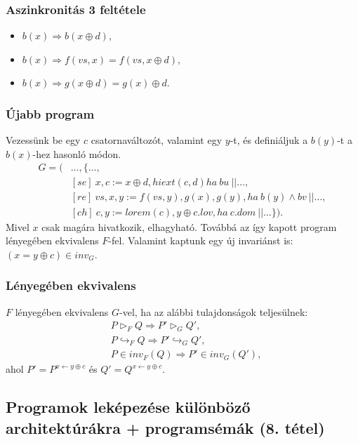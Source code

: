 \documentclass[12pt]{article}
\begin{document}
	\subsubsection{Aszinkronitás 3 feltétele}
	\begin{itemize}
		\item $b(x) \Rightarrow b(x \oplus d),$
		\item $b(x) \Rightarrow f(vs, x) = f(vs, x \oplus d),$
		\item $b(x) \Rightarrow g(x \oplus d) = g(x) \oplus d.$
	\end{itemize}
	
	\subsubsection{Újabb program}
	Vezessünk be egy $c$ csatornaváltozót, valamint egy $y$-t, és definiáljuk a $b(y)$-t a $b(x)$-hez hasonló módon.
	\begin{align*}
	G = ( &\dots, \{ \dots, \\
	&[se]\ x, c := x \oplus d, hiext(c, d) ha\ bu\ || \dots, \\
	&[re]\ vs, x, y := f(vs, y), g(x), g(y), ha\ b(y) \land bv\ || \dots, \\
	&[ch]\ c, y := lorem(c), y \oplus c.lov, ha\ c.dom\ || \dots\}).
	\end{align*}
	Mivel $x$ csak magára hivatkozik, elhagyható. Továbbá az így kapott program lényegében ekvivalens $F$-fel. Valamint kaptunk egy új invariánst is: $(x = y \oplus c) \in inv_G$.
	
	\subsubsection{Lényegében ekvivalens}
	$F$ lényegében ekvivalens $G$-vel, ha az alábbi tulajdonságok teljesülnek:
	\begin{align*}
	& P \vartriangleright_F Q \Rightarrow P' \vartriangleright_G Q', \\
	& P \hookrightarrow_F Q \Rightarrow P' \hookrightarrow_G Q', \\
	& P \in inv_F(Q) \Rightarrow P' \in inv_G(Q'),
	\end{align*}
	ahol $P' = P^{x \leftarrow y \oplus c}$ és $Q' = Q^{x \leftarrow y \oplus c}$.
	
	
	
	\subsection{Programok leképezése különböző architektúrákra + programsémák (8. tétel)}
	
\end{document}
